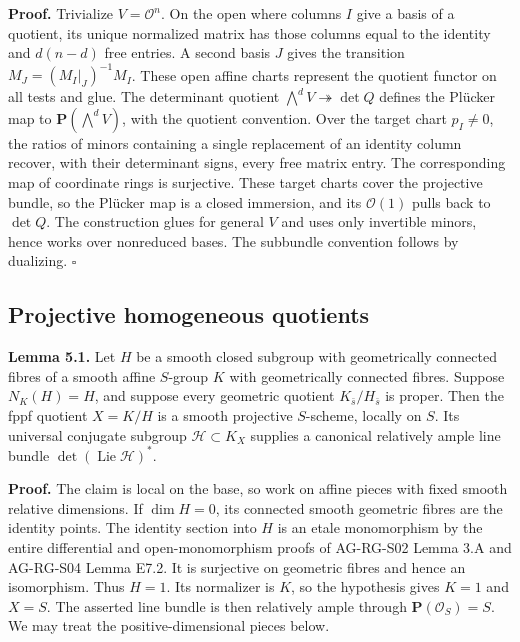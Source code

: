 \documentclass[11pt,a4paper,openany]{report}
\begin{document}
\textbf{Proof.} Trivialize \(V=\mathcal O^n\). On the open where columns \(I\) give a basis of a quotient, its unique normalized matrix has those columns equal to the identity and \(d(n-d)\) free entries. A second basis \(J\) gives the transition \(M_J=(M_I|_J)^{-1}M_I\). These open affine charts represent the quotient functor on all tests and glue. The determinant quotient \(\bigwedge^dV\twoheadrightarrow\det Q\) defines the Plücker map to \(\mathbf P(\bigwedge^dV)\), with the quotient convention. Over the target chart \(p_I\ne0\), the ratios of minors containing a single replacement of an identity column recover, with their determinant signs, every free matrix entry. The corresponding map of coordinate rings is surjective. These target charts cover the projective bundle, so the Plücker map is a closed immersion, and its \(\mathcal O(1)\) pulls back to \(\det Q\). The construction glues for general \(V\) and uses only invertible minors, hence works over nonreduced bases. The subbundle convention follows by dualizing. \(\square\)

\subsection{Projective homogeneous quotients}\label{AG-RG-03-projective-homogeneous-quotients}

\textbf{Lemma 5.1.} Let \(H\) be a smooth closed subgroup with geometrically connected fibres of a smooth affine \(S\)-group \(K\) with geometrically connected fibres. Suppose \(N_K(H)=H\), and suppose every geometric quotient \(K_{\bar s}/H_{\bar s}\) is proper. Then the fppf quotient \(X=K/H\) is a smooth projective \(S\)-scheme, locally on \(S\). Its universal conjugate subgroup \(\mathcal H\subset K_X\) supplies a canonical relatively ample line bundle \(\det(\operatorname{Lie}\mathcal H)^*\).

\textbf{Proof.} The claim is local on the base, so work on affine pieces with fixed smooth relative dimensions. If \(\dim H=0\), its connected smooth geometric fibres are the identity points. The identity section into \(H\) is an etale monomorphism by the entire differential and open-monomorphism proofs of AG-RG-S02 Lemma 3.A and AG-RG-S04 Lemma E7.2. It is surjective on geometric fibres and hence an isomorphism. Thus \(H=1\). Its normalizer is \(K\), so the hypothesis gives \(K=1\) and \(X=S\). The asserted line bundle is then relatively ample through \(\mathbf P(\mathcal O_S)=S\). We may treat the positive-dimensional pieces below.
\end{document}
